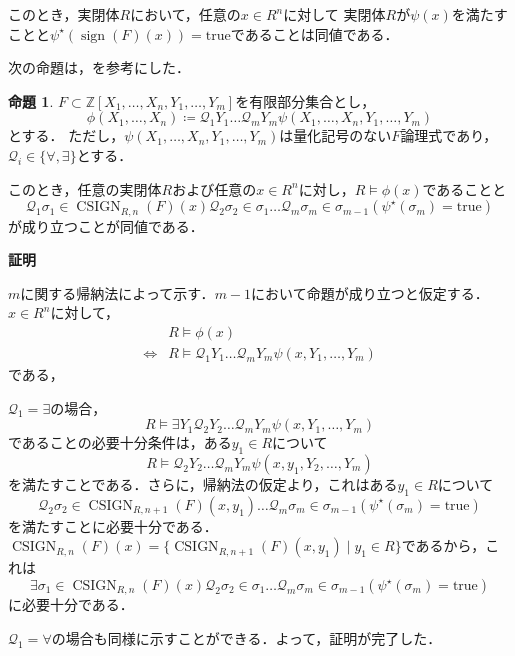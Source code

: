\documentclass[uplatex, dvipdfmx]{jsarticle}
\makeatletter
\numberwithin{equation}{section}
\renewenvironment{proof}[1][\proofname]{\par
  \pushQED{\qed}%
  \normalfont \topsep6\p@\@plus6\p@\relax
  \trivlist
  \item\relax
  {\bfseries
  #1\@addpunct{.}}\hspace\labelsep\ignorespaces
}{
  \popQED\endtrivlist\@endpefalse
}
\newcommand{\Z}{\mathbb{Z}}
\newcommand{\Qua}{\mathcal{Q}}
\newcommand{\true}{\text{true}}
\DeclareMathOperator{\sign}{sign}
\DeclareMathOperator{\CSIGN}{CSIGN}
\theoremstyle{definition}
\newtheorem{proposition}[definition]{命題}
\renewcommand{\proofname}{\textbf{証明}}
\makeatother
\begin{document}
このとき，実閉体$R$において，任意の$x \in R^n$に対して
実閉体$R$が$\psi(x)$を満たすことと$\psi^\star(\sign(F)(x)) = \true$であることは同値である．


次の命題は，\cite[Proposition 11.14]{MR2248869}を参考にした．

\begin{proposition} \label{proposition:qe-cad-propoerty}
     $F \subset \Z[X_1, \dots, X_n, Y_1, \dots, Y_m]$を有限部分集合とし，
     \begin{equation}
          \phi(X_1, \dots, X_n) \coloneqq \Qua_1 Y_1 \dots \Qua_m Y_m \psi(X_1, \dots, X_n, Y_1, \dots, Y_m)
     \end{equation}
     とする．
     ただし，$\psi(X_1, \dots, X_n, Y_1, \dots, Y_m)$は量化記号のない$F$論理式であり，$\Qua_i \in \{\forall, \exists\}$とする．

     このとき，任意の実閉体$R$および任意の$x \in R^n$に対し，$R \models \phi(x)$であることと
     \begin{equation}
          \Qua_1 \sigma_1 \in \CSIGN_{R,n}(F)(x) \Qua_2 \sigma_2 \in \sigma_1 \dots \Qua_m \sigma_m \in \sigma_{m-1} (\psi^\star(\sigma_m) = \true)
     \end{equation}
     が成り立つことが同値である．
\end{proposition}

\begin{proof}
     $m$に関する帰納法によって示す．$m-1$において命題が成り立つと仮定する．$x \in R^n$に対して，
     \begin{align}
               & R \models \phi(x)\\
          \iff & R \models \Qua_1 Y_1 \dots \Qua_m Y_m \psi(x, Y_1, \dots, Y_m)
     \end{align}
     である，
     
     $\Qua_1 = \exists$の場合，
     \begin{equation}
          R \models \exists Y_1 \Qua_2 Y_2 \dots \Qua_m Y_m \psi(x, Y_1, \dots, Y_m)
     \end{equation}
     であることの必要十分条件は，ある$y_1 \in R$について 
     \begin{equation}
          R \models \Qua_2 Y_2 \dots \Qua_m Y_m \psi(x, y_1, Y_2, \dots, Y_m)
     \end{equation}
     を満たすことである．さらに，帰納法の仮定より，これはある$y_1 \in R$について
     \begin{equation}
          \Qua_2 \sigma_2 \in \CSIGN_{R,n+1}(F)(x, y_1) \dots \Qua_m \sigma_m \in \sigma_{m-1} (\psi^\star(\sigma_m) = \true)
     \end{equation}
     を満たすことに必要十分である．$\CSIGN_{R,n}(F)(x) = \{\CSIGN_{R,n+1}(F)(x, y_1) \mid y_1 \in R\}$であるから，これは
     \begin{equation}
          \exists \sigma_1 \in \CSIGN_{R,n}(F)(x) \Qua_2 \sigma_2 \in \sigma_1 \dots \Qua_m \sigma_m \in \sigma_{m-1} (\psi^\star(\sigma_m) = \true)
     \end{equation}
     に必要十分である．
     
     $\Qua_1 = \forall$の場合も同様に示すことができる．よって，証明が完了した．
\end{proof}
\end{document}
